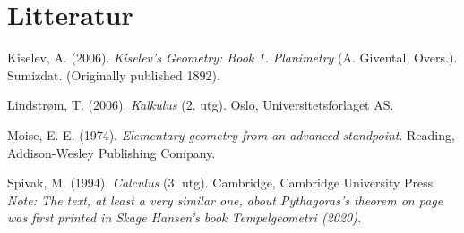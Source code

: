 



\chapter*{Litteratur}
Kiselev, A. (2006). \textit{Kiselev's Geometry: Book 1. Planimetry} (A. Givental, Overs.). Sumizdat. (Originally published 1892).\vsk

Lindstrøm, T. (2006). \textit{Kalkulus} (2. utg). Oslo, Universitetsforlaget AS.\vsk

Moise, E. E. (1974). \textit{Elementary geometry from an advanced standpoint}. Reading, Addison-Wesley Publishing Company.\vsk

Spivak, M. (1994). \textit{Calculus} (3. utg). Cambridge, Cambridge University Press
\vfill
\textit{\footnotesize Note: The text, at least a very similar one, about Pythagoras's theorem on page \pageref{pytforklaringintro} was first printed in Skage Hansen's book \textit{Tempelgeometri} (2020).}
\newpage
